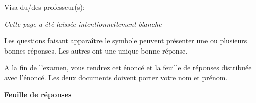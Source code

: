 \documentclass[a4paper]{article}
\begin{document}
\begin{examcopy}[1]
    \vspace*{4cm}Visa du/des professeur(s): \dotfill


    \vfill
    \newpage

    \vspace{3cm}

    \begin{center}
      \textit{Cette page a été laissée intentionnellement blanche}
    \end{center}


    \newpage

    {
    \em\setlength{\parindent}{0pt}

    Les questions faisant apparaître le symbole \multiSymbole{} peuvent
      présenter une ou plusieurs bonnes réponses. Les autres ont
      une unique bonne réponse.
    \newline

    A la fin de l'examen, vous rendrez cet énoncé et la feuille de réponses distribuée avec l'énoncé.
      Les deux documents doivent porter votre nom et prénom.
    \newline


    }\hspace*{\fill}
    \vspace{1ex}

    

    \AMCcleardoublepage

    \AMCdebutFormulaire

    {\large\bf\noindent Feuille de réponses}

    {\setlength{\parindent}{0pt}\hspace*{\fill}

    \begin{minipage}[b]{6.5cm}\setlength{\parindent}{0pt}


\end{minipage}}
\end{examcopy}
\end{document}
